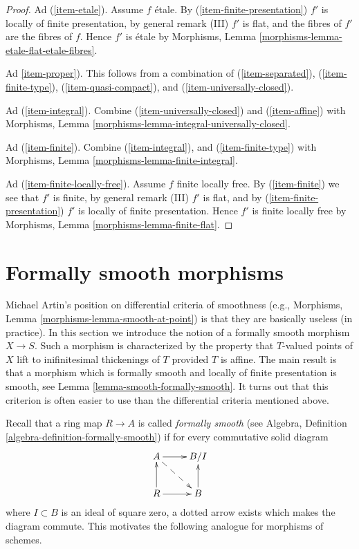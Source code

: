 \begin{proof}
\medskip\noindent
Ad (\ref{item-etale}). Assume $f$ \'etale. By
(\ref{item-finite-presentation}) $f'$ is locally of finite presentation,
by general remark (III) $f'$ is flat, and the fibres of $f'$ are the fibres
of $f$. Hence $f'$ is \'etale by
Morphisms, Lemma \ref{morphisms-lemma-etale-flat-etale-fibres}.

\medskip\noindent
Ad \ref{item-proper}). This follows from a combination of
(\ref{item-separated}), (\ref{item-finite-type}), (\ref{item-quasi-compact}),
and (\ref{item-universally-closed}).

\medskip\noindent
Ad (\ref{item-integral}). Combine (\ref{item-universally-closed}) and
(\ref{item-affine}) with
Morphisms, Lemma \ref{morphisms-lemma-integral-universally-closed}.

\medskip\noindent
Ad (\ref{item-finite}). Combine (\ref{item-integral}),
and (\ref{item-finite-type}) with
Morphisms, Lemma \ref{morphisms-lemma-finite-integral}.

\medskip\noindent
Ad (\ref{item-finite-locally-free}). Assume $f$ finite locally free. By
(\ref{item-finite}) we see that $f'$ is finite, by general remark (III)
$f'$ is flat, and by (\ref{item-finite-presentation}) $f'$ is locally of finite
presentation. Hence $f'$ is finite locally free by
Morphisms, Lemma \ref{morphisms-lemma-finite-flat}.
\end{proof}







\section{Formally smooth morphisms}
\label{section-formally-smooth}

\noindent
Michael Artin's position on differential criteria of smoothness (e.g.,
Morphisms, Lemma \ref{morphisms-lemma-smooth-at-point}) is that they are
basically useless (in practice). In this section we introduce the
notion of a formally smooth morphism $X \to S$. Such a morphism is
characterized by the property that $T$-valued points of $X$ lift
to inifinitesimal thickenings of $T$ provided $T$ is affine.
The main result is that a morphism which is formally smooth and
locally of finite presentation is smooth, see
Lemma \ref{lemma-smooth-formally-smooth}.
It turns out that this criterion is often easier to use than the
differential criteria mentioned above.

\medskip\noindent
Recall that a ring map $R \to A$ is called {\it formally smooth}
(see Algebra, Definition \ref{algebra-definition-formally-smooth})
if for every commutative solid diagram
$$
\xymatrix{
A \ar[r] \ar@{-->}[rd] & B/I \\
R \ar[r] \ar[u] & B \ar[u]
}
$$
where $I \subset B$ is an ideal of square zero, a dotted
arrow exists which makes the diagram commute. This motivates
the following analogue for morphisms of schemes.

